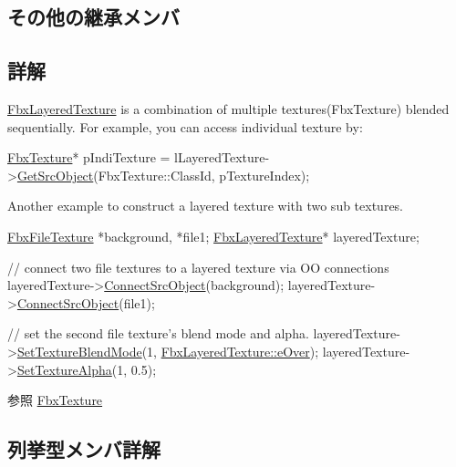 \subsection*{その他の継承メンバ}


\subsection{詳解}
\hyperlink{class_fbx_layered_texture}{Fbx\+Layered\+Texture} is a combination of multiple textures(\+Fbx\+Texture) blended sequentially. For example, you can access individual texture by\+: 
\begin{DoxyCode}
\hyperlink{class_fbx_texture}{FbxTexture}* pIndiTexture = lLayeredTexture->\hyperlink{class_fbx_object_a655ed30675d9bf1686ec075f5e7c7a84}{GetSrcObject}(FbxTexture::ClassId, 
      pTextureIndex);
\end{DoxyCode}
 Another example to construct a layered texture with two sub textures. 
\begin{DoxyCode}
\hyperlink{class_fbx_file_texture}{FbxFileTexture} *background, *file1;
\hyperlink{class_fbx_layered_texture}{FbxLayeredTexture}* layeredTexture;

\textcolor{comment}{// connect two file textures to a layered texture via OO connections}
layeredTexture->\hyperlink{class_fbx_object_a1c75d466c5166486787bfa06b4fd221f}{ConnectSrcObject}(background);
layeredTexture->\hyperlink{class_fbx_object_a1c75d466c5166486787bfa06b4fd221f}{ConnectSrcObject}(file1);

\textcolor{comment}{// set the second file texture's blend mode and alpha.}
layeredTexture->\hyperlink{class_fbx_layered_texture_ae16a157ad7ff41d377a2cff885a00c80}{SetTextureBlendMode}(1, 
      \hyperlink{class_fbx_layered_texture_af291d42b0329513909d2ddf48f56f5baab235ee3fa24dcb41e4d8e1ae837bae70}{FbxLayeredTexture::eOver});
layeredTexture->\hyperlink{class_fbx_layered_texture_a87145db35c3a207f5e54c9a9dcd83f1f}{SetTextureAlpha}(1, 0.5);
\end{DoxyCode}


\begin{DoxySeeAlso}{参照}
\hyperlink{class_fbx_texture}{Fbx\+Texture} 
\end{DoxySeeAlso}


\subsection{列挙型メンバ詳解}
\mbox{\label{class_fbx_layered_texture_af291d42b0329513909d2ddf48f56f5ba}} 
